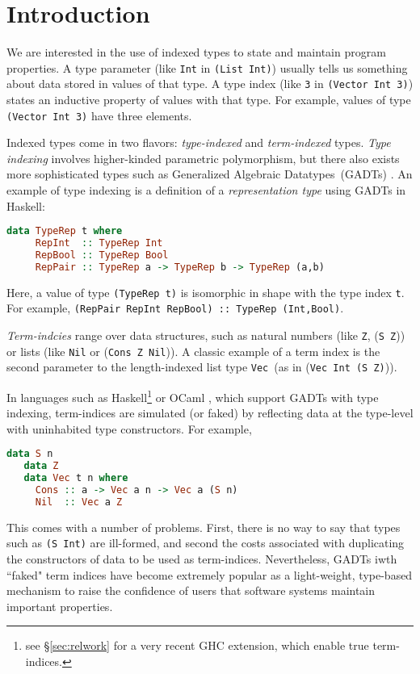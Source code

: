 \section{Introduction}


We are interested in the use of indexed types to state and
maintain program properties. A type parameter
(like {\tt Int} in {\tt (List Int)}) usually tells us
something about data stored in values of that type.
A type index (like {\tt 3} in {\tt (Vector Int 3)}) states
an inductive property of values with that type. For example,
values of type {\tt (Vector Int 3)} have three elements.

Indexed types come in two flavors: \emph{type-indexed} and \emph{term-indexed}
types. {\it Type indexing} involves higher-kinded parametric polymorphism,
but there also exists more sophisticated types such as
Generalized Algebraic Datatypes~(GADTs) \cite{Sheard04equality}.
An example of type indexing is a definition of a \emph{representation type}
\cite{crary98intensional} using GADTs in Haskell:\vspace*{-2pt}
\begin{lstlisting}[basicstyle={\ttfamily\small},language=Haskell,mathescape]
   data TypeRep t where
     RepInt  :: TypeRep Int
     RepBool :: TypeRep Bool
     RepPair :: TypeRep a -> TypeRep b -> TypeRep (a,b)
\end{lstlisting}\vspace*{-2pt}
Here, a value of type {\tt\small (TypeRep t)} is isomorphic in shape with
the type index {\tt t}. For example,
{\tt (RepPair RepInt RepBool) :: TypeRep (Int,Bool)}.

{\it Term-indcies} range over data structures, such as natural numbers
(like {\tt Z}, {(\tt S Z})) or lists (like {\tt Nil} or ({\tt Cons Z Nil})). 
A classic example of a term index is the second parameter to
the length-indexed list type {\tt Vec}~(as in ({\tt Vec Int (S Z)})).

In languages such as Haskell\footnote{see \S\ref{sec:relwork} for
        a very recent GHC extension, which enable true term-indices.}
	or OCaml \cite{GarNor11}, which support GADTs with type indexing,
term-indices are simulated (or faked) by reflecting data at the type-level
with uninhabited type constructors. For example,\vspace*{-2pt}
\begin{lstlisting}[basicstyle={\ttfamily\small},language=Haskell,mathescape]
   data S n
   data Z
   data Vec t n where
     Cons :: a -> Vec a n -> Vec a (S n)
     Nil  :: Vec a Z
\end{lstlisting}\vspace*{-2pt}
This comes with a number of problems. First, there is no way to say
that types such as {\tt (S Int)} are ill-formed, and second the costs
associated with duplicating the constructors of data to be used
as term-indices.
Nevertheless, GADTs iwth ``faked" term indices have become extremely popular
as a light-weight, type-based mechanism to raise the confidence of users
that software systems maintain important properties.

